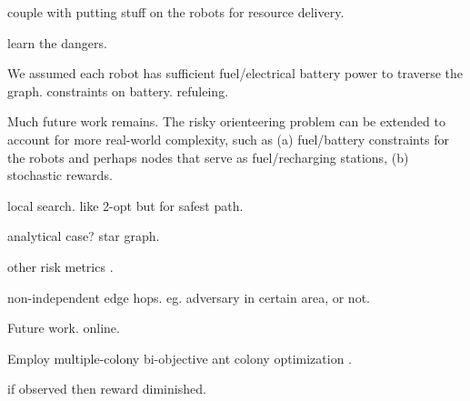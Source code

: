 \documentclass[11pt, oneside]{article}
\begin{document}
couple with putting stuff on the robots for resource delivery.

learn the dangers.

We assumed each robot has sufficient fuel/electrical battery power to traverse the graph.
constraints on battery. refuleing.

Much future work remains.
The risky orienteering problem can be extended to account for more real-world complexity, such as (a) fuel/battery constraints for the robots and perhaps nodes that serve as fuel/recharging stations, (b) stochastic rewards.

local search. like 2-opt but for safest path.

analytical case? star graph.

other risk metrics \cite{majumdar2020should}.

non-independent edge hops. eg. adversary in certain area, or not.

Future work. online.

Employ multiple-colony bi-objective ant colony optimization \cite{iredi2001bi}.

if observed then reward diminished.




\end{document}
